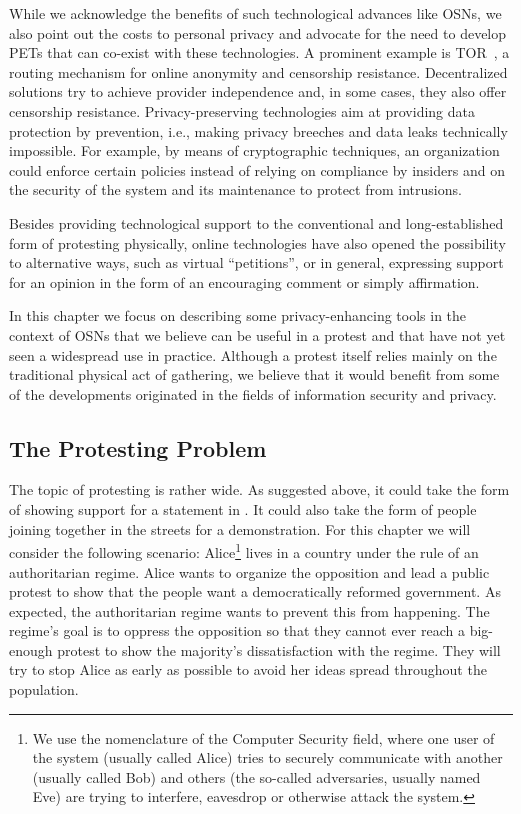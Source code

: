 While we acknowledge the benefits of such technological advances like
\acp{OSN}, we also point out the costs to personal privacy and
advocate for the need to develop \acp{PET} that can co-exist with
these technologies. A prominent example is TOR~\cite{Tor}, a routing
mechanism for online anonymity and censorship
resistance. Decentralized solutions try to achieve provider
independence and, in some cases, they also offer censorship
resistance. Privacy-preserving technologies aim at providing data
protection by prevention, i.e., making privacy breeches and data leaks
technically impossible. For example, by means of cryptographic
techniques, an organization could enforce certain policies instead of
relying on compliance by insiders and on the security of the system and its
maintenance to protect from intrusions. %

Besides providing technological support to the conventional and
long-established form of protesting physically, online technologies
have also opened the possibility to alternative ways, such as virtual
\enquote{petitions}, or in general, expressing support for an opinion
in the form of an encouraging comment or simply affirmation.

In this chapter we focus on describing some privacy-enhancing tools in
the context of \acp{OSN} that we believe can be useful in a protest
and that have not yet seen a widespread use in practice. Although a
protest itself relies mainly on the traditional physical act of
gathering, we believe that it would benefit from some of the
developments originated in the fields of information security and
privacy.

\subsection{The Protesting Problem}

The topic of protesting is rather wide.
As suggested above, it could take the form of showing support for a statement 
in .
It could also take the form of people joining together in the streets for 
a demonstration.
For this chapter we will consider the following scenario:
Alice\footnote{%
  We use the nomenclature of the Computer Security field,
  where one user of the system (usually called Alice) tries to securely communicate
  with another (usually called Bob) and others (the so-called adversaries, usually
  named Eve) are trying to interfere, eavesdrop or otherwise attack the
  system. 

} lives in a country under the rule of an authoritarian regime.
Alice wants to organize the opposition and lead a public protest to show that 
the people want a democratically reformed government.
As expected, the authoritarian regime wants to prevent this from happening.
The regime's goal is to oppress the opposition so that they cannot ever reach 
a big-enough protest to show the majority's dissatisfaction with the regime.
They will try to stop Alice as early as possible to avoid her ideas spread 
throughout the population.

